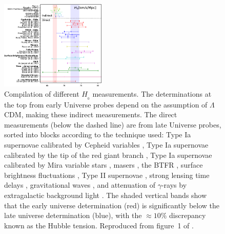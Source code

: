 \documentclass[fleqn,usenatbib,useAMS]{mnras} %
\begin{document}
\begin{figure}
	\centering
	\includegraphics[width=0.45\textwidth]{Valentino_2021_Figure_1}
	\caption{Compilation of different $H_{_0}$ measurements. The determinations at the top from early Universe probes depend on the assumption of $\Lambda$CDM, making these indirect measurements. The direct measurements (below the dashed line) are from late Universe probes, sorted into blocks according to the technique used: Type Ia supernovae calibrated by Cepheid variables \citep{Freedman_2012, Burns_2018, Breuval_2020, Riess_2019, Riess_2021}, Type Ia supernovae calibrated by the tip of the red giant branch \citep{Jang_2017, Reid_2019, Yuan_2019, Freedman_2020, Soltis_2021}, Type Ia supernovae calibrated by Mira variable stars \citep{Huang_2020}, masers \citep{Pesce_2020}, the BTFR \citep{Kourkchi_2020, Schombert_2020}, surface brightness fluctuations \citep{Blakeslee_2021, Khetan_2021}, Type II supernovae \citep{Jaeger_2020}, strong lensing time delays \citep{Birrer_2020, Shajib_2020, Wong_2020}, gravitational waves \citep{Abbott_2017}, and attenuation of $\gamma$-rays by extragalactic background light \citep{Dominguez_2019}. The shaded vertical bands show that the early universe determination (red) is significantly below the late universe determination (blue), with the $\approx10\%$ discrepancy known as the Hubble tension. Reproduced from figure~1 of \citep{Valentino_2021}.}
	\label{Valentino_2021_Figure_1}
\end{figure}
\end{document}
